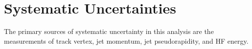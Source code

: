 
\chapter{Systematic Uncertainties}

The primary sources of systematic uncertainty in this analysis are the measurements of track vertex, jet momentum, jet pseudorapidity, and HF energy. 